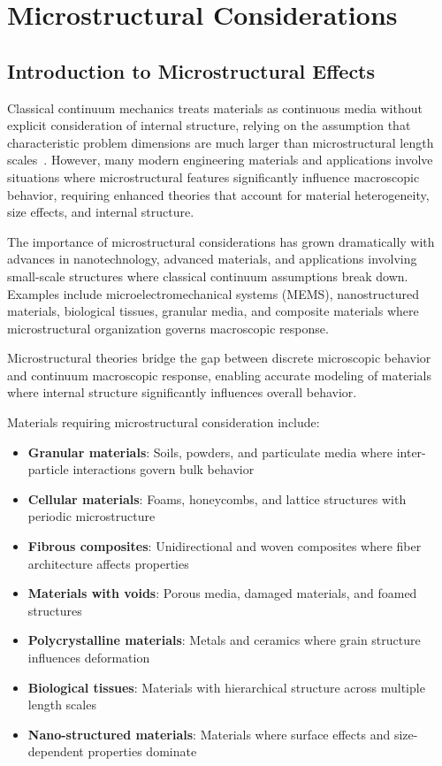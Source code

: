 \chapter{Microstructural Considerations}

\section{Introduction to Microstructural Effects}

Classical continuum mechanics treats materials as continuous media without explicit consideration of internal structure, relying on the assumption that characteristic problem dimensions are much larger than microstructural length scales~\autocite{Sadd.2019}. However, many modern engineering materials and applications involve situations where microstructural features significantly influence macroscopic behavior, requiring enhanced theories that account for material heterogeneity, size effects, and internal structure.

The importance of microstructural considerations has grown dramatically with advances in nanotechnology, advanced materials, and applications involving small-scale structures where classical continuum assumptions break down. Examples include microelectromechanical systems (MEMS), nanostructured materials, biological tissues, granular media, and composite materials where microstructural organization governs macroscopic response.

\begin{keypoint}
Microstructural theories bridge the gap between discrete microscopic behavior and continuum macroscopic response, enabling accurate modeling of materials where internal structure significantly influences overall behavior.
\end{keypoint}

Materials requiring microstructural consideration include:
\begin{itemize}
\item \textbf{Granular materials}: Soils, powders, and particulate media where inter-particle interactions govern bulk behavior
\item \textbf{Cellular materials}: Foams, honeycombs, and lattice structures with periodic microstructure
\item \textbf{Fibrous composites}: Unidirectional and woven composites where fiber architecture affects properties
\item \textbf{Materials with voids}: Porous media, damaged materials, and foamed structures
\item \textbf{Polycrystalline materials}: Metals and ceramics where grain structure influences deformation
\item \textbf{Biological tissues}: Materials with hierarchical structure across multiple length scales
\item \textbf{Nano-structured materials}: Materials where surface effects and size-dependent properties dominate
\end{itemize}

